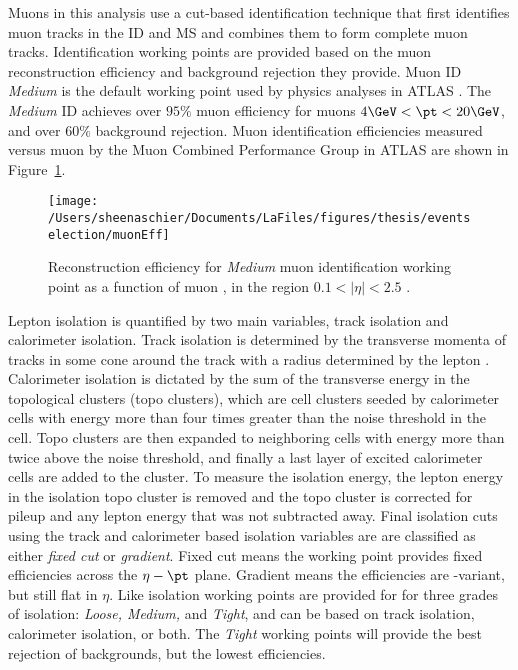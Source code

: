  Muons in this analysis use a cut-based identification technique that first identifies muon tracks in the ID and MS and combines them to form complete muon tracks.  Identification working points are provided based on the muon reconstruction efficiency and background rejection they provide.  Muon ID \textit{Medium} is the default working point used by physics analyses in ATLAS \cite{muonid}.  The \textit{Medium} ID achieves over $95\%$ muon efficiency for muons $4\GeV<\pt<20\GeV$, and over $60\%$ background rejection.  Muon identification efficiencies measured versus muon \pt by the Muon Combined Performance Group in ATLAS are shown in Figure~\ref{fig:emuon}. 
 \begin{figure}[h!]
 \centering
 \texttt{[image: /Users/sheenaschier/Documents/LaFiles/figures/thesis/eventselection/muonEff]}
 \caption{Reconstruction efficiency for \textit{Medium} muon identification working point as a function of muon \pt, in the region $0.1<|\eta|<2.5$ \cite{muon}.}
 \label{fig:emuon}
 \end{figure}
  
Lepton isolation is quantified by two main variables, track isolation and calorimeter isolation.  Track isolation is determined by the transverse momenta of tracks in some cone around the track with a radius determined by the lepton \pt.  Calorimeter isolation is dictated by the sum of the transverse energy in the topological clusters (topo clusters), which are cell clusters seeded by calorimeter cells with energy more than four times greater than the noise threshold in the cell.  Topo clusters are then expanded to neighboring cells with energy more than twice above the noise threshold, and finally a last layer of excited calorimeter cells are added to the cluster.  To measure the isolation energy, the lepton energy in the isolation topo cluster is removed and the topo cluster is corrected for pileup and any lepton energy that was not subtracted away.  Final isolation cuts using the track and calorimeter based isolation variables are are classified as either \textit{fixed cut} or \textit{gradient}.  Fixed cut means the working point provides fixed efficiencies across the $\eta-\pt$ plane.  Gradient means the efficiencies are \pt-variant, but still flat in $\eta$.  Like isolation working points are provided for for three grades of isolation: \textit{Loose, Medium,} and \textit{Tight}, and can be based on track isolation, calorimeter isolation, or both.  The \textit{Tight} working points will provide the best rejection of backgrounds, but the lowest efficiencies.
 
